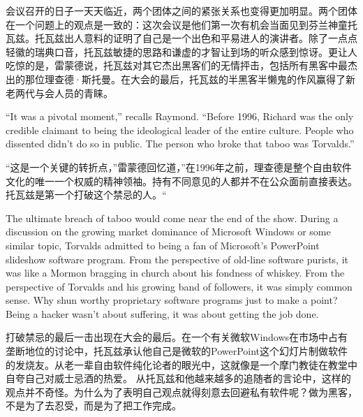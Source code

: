\ifdefined\chs
会议召开的日子一天天临近，两个团体之间的紧张关系也变得更加明显。两个团体在一个问题上的观点是一致的：这次会议是他们第一次有机会当面见到芬兰神童托瓦兹。托瓦兹出人意料的证明了自己是一个出色和平易进人的演讲者。除了一点点轻徽的瑞典口音，托瓦兹敏捷的思路和谦虚的才智让到场的听众感到惊讶。更让人吃惊的是，雷蒙德说，托瓦兹对其它杰出黑客们的无情抨击，包括所有黑客中最杰出的那位理查德·斯托曼。在大会的最后，托瓦兹的半黑客半懒鬼的作风赢得了新老两代与会人员的青睐。
\fi

\ifdefined\eng
``It was a pivotal moment,'' recalls Raymond. ``Before 1996, Richard was the only credible claimant to being the ideological leader of the entire culture. People who dissented didn't do so in public. The person who broke that taboo was Torvalds.''
\fi

\ifdefined\chs
“这是一个关键的转折点，”雷蒙德回忆道，”在1996年之前，理查德是整个自由软件文化的唯一一个权威的精神领袖。持有不同意见的人都并不在公众面前直接表达。托瓦兹是第一个打破这个禁忌的人。“
\fi

\ifdefined\eng
The ultimate breach of taboo would come near the end of the show. During a discussion on the growing market dominance of Microsoft Windows or some similar topic, Torvalds admitted to being a fan of Microsoft's PowerPoint slideshow software program. From the perspective of old-line software purists, it was like a Mormon bragging in church about his fondness of whiskey. From the perspective of Torvalds and his growing band of followers, it was simply common sense. Why shun worthy proprietary software programs just to make a point? Being a hacker wasn't about suffering, it was about getting the job done.
\fi

\ifdefined\chs
打破禁忌的最后一击出现在大会的最后。在一个有关微软Windows在市场中占有垄断地位的讨论中，托瓦兹承认他自己是微软的PowerPoint这个幻灯片制做软件的发烧友。从老一辈自由软件纯化论者的眼光中，这就像是一个摩门教徒在教堂中自夸自己对威士忌酒的热爱。 从托瓦兹和他越来越多的追随者的言论中，这样的观点并不奇怪。为什么为了表明自己观点就得刻意去回避私有软件呢？做为黑客，不是为了去忍受，而是为了把工作完成。
\fi

